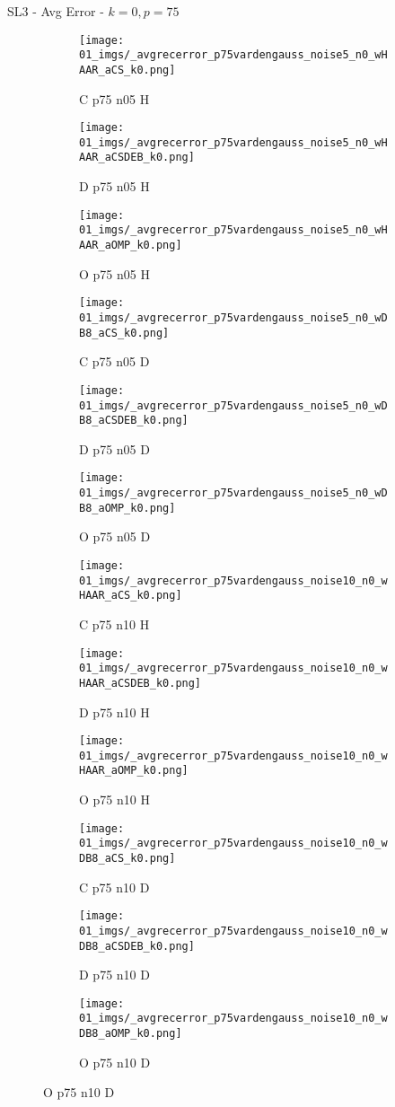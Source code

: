 \begin{frame}{SL3 - Avg Error - $k=0,p=75$}{}
\begin{figure}
\begin{subfigure}{0.13\textwidth}
\texttt{[image: 01\_imgs/\_avgrecerror\_p75vardengauss\_noise5\_n0\_wHAAR\_aCS\_k0.png]}
\caption*{\tiny C p75 n05 H}
\end{subfigure}
\begin{subfigure}{0.13\textwidth}
\texttt{[image: 01\_imgs/\_avgrecerror\_p75vardengauss\_noise5\_n0\_wHAAR\_aCSDEB\_k0.png]}
\caption*{\tiny D p75 n05 H}
\end{subfigure}
\begin{subfigure}{0.13\textwidth}
\texttt{[image: 01\_imgs/\_avgrecerror\_p75vardengauss\_noise5\_n0\_wHAAR\_aOMP\_k0.png]}
\caption*{\tiny O p75 n05 H}
\end{subfigure}
\begin{subfigure}{0.13\textwidth}
\texttt{[image: 01\_imgs/\_avgrecerror\_p75vardengauss\_noise5\_n0\_wDB8\_aCS\_k0.png]}
\caption*{\tiny C p75 n05 D}
\end{subfigure}
\begin{subfigure}{0.13\textwidth}
\texttt{[image: 01\_imgs/\_avgrecerror\_p75vardengauss\_noise5\_n0\_wDB8\_aCSDEB\_k0.png]}
\caption*{\tiny D p75 n05 D}
\end{subfigure}
\begin{subfigure}{0.13\textwidth}
\texttt{[image: 01\_imgs/\_avgrecerror\_p75vardengauss\_noise5\_n0\_wDB8\_aOMP\_k0.png]}
\caption*{\tiny O p75 n05 D}
\end{subfigure}

\vspace{5pt}

\begin{subfigure}{0.13\textwidth}
\texttt{[image: 01\_imgs/\_avgrecerror\_p75vardengauss\_noise10\_n0\_wHAAR\_aCS\_k0.png]}
\caption*{\tiny C p75 n10 H}
\end{subfigure}
\begin{subfigure}{0.13\textwidth}
\texttt{[image: 01\_imgs/\_avgrecerror\_p75vardengauss\_noise10\_n0\_wHAAR\_aCSDEB\_k0.png]}
\caption*{\tiny D p75 n10 H}
\end{subfigure}
\begin{subfigure}{0.13\textwidth}
\texttt{[image: 01\_imgs/\_avgrecerror\_p75vardengauss\_noise10\_n0\_wHAAR\_aOMP\_k0.png]}
\caption*{\tiny O p75 n10 H}
\end{subfigure}
\begin{subfigure}{0.13\textwidth}
\texttt{[image: 01\_imgs/\_avgrecerror\_p75vardengauss\_noise10\_n0\_wDB8\_aCS\_k0.png]}
\caption*{\tiny C p75 n10 D}
\end{subfigure}
\begin{subfigure}{0.13\textwidth}
\texttt{[image: 01\_imgs/\_avgrecerror\_p75vardengauss\_noise10\_n0\_wDB8\_aCSDEB\_k0.png]}
\caption*{\tiny D p75 n10 D}
\end{subfigure}
\begin{subfigure}{0.13\textwidth}
\texttt{[image: 01\_imgs/\_avgrecerror\_p75vardengauss\_noise10\_n0\_wDB8\_aOMP\_k0.png]}
\caption*{\tiny O p75 n10 D}
\end{subfigure}


\end{figure}
\end{frame}
